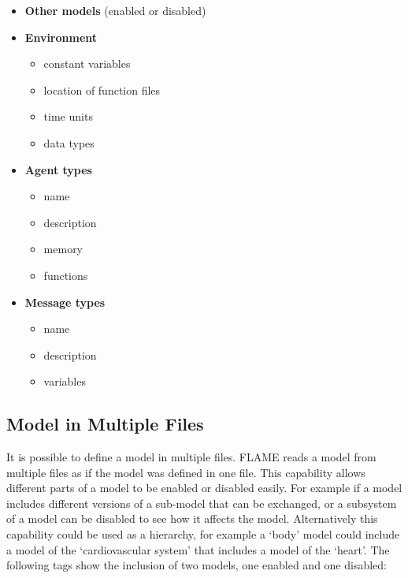 \begin{itemize}
\item \textbf{Other models} (enabled or disabled)
\item \textbf{Environment}
\begin{itemize}
\item constant variables
\item location of function files
\item time units
\item data types
\end{itemize}
\item \textbf{Agent types}
\begin{itemize}
\item name
\item description
\item memory
\item functions
\end{itemize}
\item \textbf{Message types}
\begin{itemize}
\item name
\item description
\item variables
\end{itemize}
\end{itemize}

\subsection{Model in Multiple Files}

It is possible to define a model in multiple files. FLAME reads a model from
multiple files as if the model was defined in one file. This capability allows
different parts of a model to be enabled or disabled easily. For example if a
model includes different versions of a sub-model that can be exchanged, or a
subsystem of a model can be disabled to see how it affects the model.
Alternatively this capability could be used as a hierarchy, for example a `body'
model could include a model of the `cardiovascular system' that includes a
model of the `heart'. The following tags show the inclusion of two models, one
enabled and one disabled:

